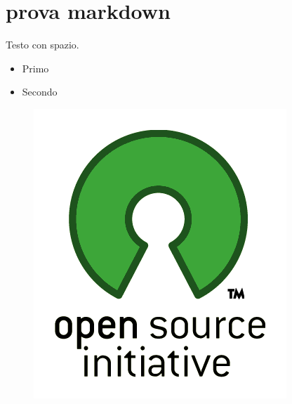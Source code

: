 \documentclass[12pt,oneside,a4paper]{book}
\begin{document}
\part{prova markdown}
\label{provamarkdown}


Testo con spazio.

\begin{itemize}
\item Primo

\item Secondo

\end{itemize}

\begin{figure}[htbp]
\centering
\includegraphics{./CommonImages/logo}
\end{figure}
\end{document}
